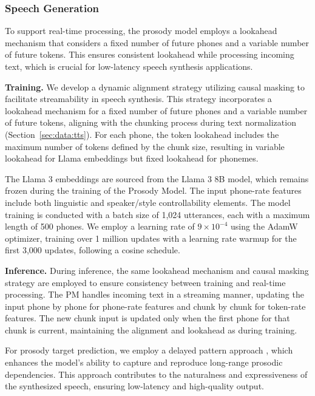 \subsubsection{Speech Generation}
To support real-time processing, the prosody model employs a lookahead mechanism that considers a fixed number of future phones and a variable number of future tokens. This ensures consistent lookahead while processing incoming text, which is crucial for low-latency speech synthesis applications.

\textbf{Training.} We develop a dynamic alignment strategy utilizing causal masking to facilitate streamability in speech synthesis. This strategy incorporates a lookahead mechanism for a fixed number of future phones and a variable number of future tokens, aligning with the chunking process during text normalization (Section~\ref{sec:data:tts}). For each phone, the token lookahead includes the maximum number of tokens defined by the chunk size, resulting in variable lookahead for Llama embeddings but fixed lookahead for phonemes.

The Llama 3 embeddings are sourced from the Llama 3 8B model, which remains frozen during the training of the Prosody Model. The input phone-rate features include both linguistic and speaker/style controllability elements. The model training is conducted with a batch size of 1,024 utterances, each with a maximum length of 500 phones. We employ a learning rate of \(9 \times 10^{-4}\) using the AdamW optimizer, training over 1 million updates with a learning rate warmup for the first 3,000 updates, following a cosine schedule.

\textbf{Inference.} During inference, the same lookahead mechanism and causal masking strategy are employed to ensure consistency between training and real-time processing. The PM handles incoming text in a streaming manner, updating the input phone by phone for phone-rate features and chunk by chunk for token-rate features. The new chunk input is updated only when the first phone for that chunk is current, maintaining the alignment and lookahead as during training.

For prosody target prediction, we employ a delayed pattern approach \citep{kharitonov2021text}, which enhances the model’s ability to capture and reproduce long-range prosodic dependencies. This approach contributes to the naturalness and expressiveness of the synthesized speech, ensuring low-latency and high-quality output.
